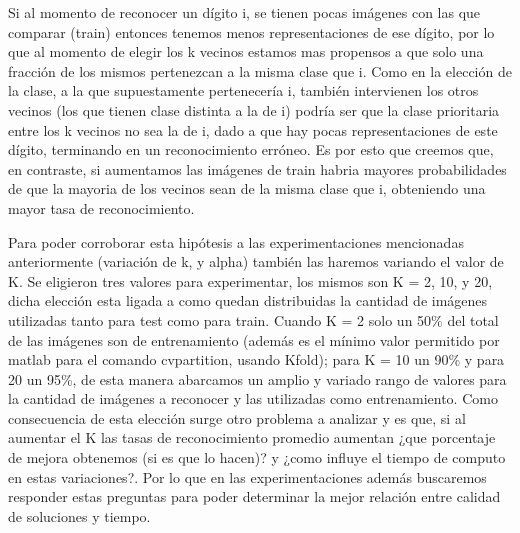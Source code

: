 Si al momento de reconocer un dígito i, se tienen pocas imágenes con las que comparar (train) entonces tenemos menos representaciones de ese dígito, por lo que al momento de elegir los k vecinos estamos mas propensos a que solo una fracción de los mismos pertenezcan a la misma clase que i. Como en la elección de la clase, a la que supuestamente pertenecería i, también intervienen los otros vecinos (los que tienen clase distinta a la de i) podría ser que la clase prioritaria entre los k vecinos no sea la de i, dado a que hay pocas representaciones de este dígito, terminando en un reconocimiento erróneo. Es por esto que creemos que, en contraste, si aumentamos las imágenes de train habria mayores probabilidades de que la mayoria de los vecinos sean de la misma clase que i, obteniendo una mayor tasa de reconocimiento. 

Para poder corroborar esta hipótesis a las experimentaciones mencionadas anteriormente (variación de k, y alpha) también las haremos variando el valor de K. Se eligieron tres valores para experimentar, los mismos son K =  2, 10, y 20, dicha elección esta ligada a como quedan distribuidas la cantidad de imágenes utilizadas tanto para test como para train. Cuando K = 2 solo un 50\% del total de las imágenes son de entrenamiento (además es el mínimo valor permitido por matlab para el comando cvpartition, usando Kfold); para K = 10 un 90\% y para 20 un 95\%, de esta manera abarcamos un amplio y variado rango de valores para la cantidad de imágenes a reconocer y las utilizadas como entrenamiento. Como consecuencia de esta elección surge otro problema a analizar y es que, si al aumentar el K las tasas de reconocimiento promedio aumentan ¿que porcentaje de mejora obtenemos (si es que lo hacen)? y ¿como influye el tiempo de computo en estas variaciones?. Por lo que en las experimentaciones además buscaremos responder estas preguntas para poder determinar la mejor relación entre calidad de soluciones y tiempo. 



